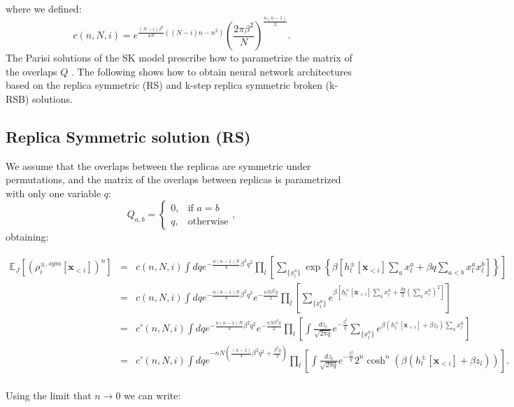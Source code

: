 \documentclass[10pt, notitlepage]{revtex4-2}
\begin{document}
where we defined: 
$$c(n,N,i) = e^{ \frac{(N-i) \beta^2}{4N}((N-i)n-n^2) } \left(\frac{2\pi \beta^2}{N}\right)^{\frac{n(n-1)}{2}}.$$ 
The Parisi solutions of the SK model prescribe how to parametrize the matrix of the overlaps $Q$ \cite{10.1142/0271}. The following shows how to obtain neural network architectures based on the replica symmetric (RS) and k-step replica symmetric broken (k-RSB) solutions.

\subsection{Replica Symmetric solution (RS)}
\label{sec:RS}
We assume that the overlaps between the replicas are symmetric under permutations, and the matrix of the overlaps between replicas is parametrized with only one variable $q$:
$$
Q_{a,b}=\begin{cases}
			0, & \text{if $a=b$}\\
            q, & \text{otherwise}
		 \end{cases},
$$
obtaining:
\begin{widetext}
\begin{eqnarray}
\mathbb{E}_{\underline{J}}\left[(\rho_i^{\pm, sym}[\mathbf{x}_{<i}])^n \right] & = & 
c(n,N,i)
\int dq e^{-\frac{n(n-1)N}{4}\beta^2 q^2}
\prod_{l} \left[
\sum_{\{\underline{x}^{a}_l\}} 
\exp\left\{\beta \left[
h_l^{\pm}[\mathbf{x}_{<i}] \sum_{a} x_l^{a} +\beta q \sum_{a<b} x_l^{a} x_l^{b} \right]  \right\} 
\right] \\
& = &
c(n,N,i)
\int dq e^{-\frac{n(n-1)N}{4}\beta^2 q^2}
e^{-\frac{nN\beta^2 q}{2}}
\prod_{l} \left[
\sum_{\{\underline{x}^{a}_l\}} 
e^{\beta \left[
h_l^{\pm}[\mathbf{x}_{<i}] \sum_{a} x_l^{a} + \frac{\beta q}{2} \left(\sum_{a} x_l^{a} \right)^2 \right]} 
\right]\\
& = &
c'(n,N,i)
\int dq e^{-\frac{n(n-1)N}{4}\beta^2 q^2}
e^{-\frac{nN\beta^2 q}{2}}
\prod_{l} \left[\int \frac{dz_l}{\sqrt{2\pi q}} e^{-\frac{z_l^2}{q}}
\sum_{\{\underline{x}^{a}_l\}} 
e^{\beta \left(
h_l^{\pm}[\mathbf{x}_{<i}] +\beta z_l \right) \sum_{a} x_l^{a}} 
\right]\\
& = &
c'(n,N,i)
\int dq e^{-nN\left(\frac{(n-1)}{4}\beta^2 q^2 +\frac{\beta^2 q}{2}\right)}
\prod_{l} \left[\int \frac{dz_l}{\sqrt{2\pi q}} e^{-\frac{z_l^2}{q}}
2^n\cosh^n \left(\beta \left(
h_l^{\pm}[\mathbf{x}_{<i}] +\beta z_l \right)\right) 
\right].\\
\end{eqnarray}
\end{widetext}
Using the limit that $n\rightarrow 0$ we can write:
\end{document}
